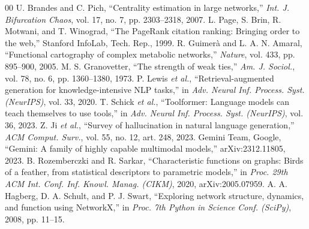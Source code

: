 \documentclass[conference]{IEEEtran}
\begin{document}
\begin{thebibliography}{00}
 U. Brandes and C. Pich, ``Centrality estimation in large networks,'' \emph{Int. J. Bifurcation Chaos}, vol. 17, no. 7, pp. 2303--2318, 2007.
 L. Page, S. Brin, R. Motwani, and T. Winograd, ``The PageRank citation ranking: Bringing order to the web,'' Stanford InfoLab, Tech. Rep., 1999.
 R. Guimer\`a and L. A. N. Amaral, ``Functional cartography of complex metabolic networks,'' \emph{Nature}, vol. 433, pp. 895--900, 2005.
 M. S. Granovetter, ``The strength of weak ties,'' \emph{Am. J. Sociol.}, vol. 78, no. 6, pp. 1360--1380, 1973.
 P. Lewis \emph{et al.}, ``Retrieval-augmented generation for knowledge-intensive NLP tasks,'' in \emph{Adv. Neural Inf. Process. Syst. (NeurIPS)}, vol. 33, 2020.
 T. Schick \emph{et al.}, ``Toolformer: Language models can teach themselves to use tools,'' in \emph{Adv. Neural Inf. Process. Syst. (NeurIPS)}, vol. 36, 2023.
 Z. Ji \emph{et al.}, ``Survey of hallucination in natural language generation,'' \emph{ACM Comput. Surv.}, vol. 55, no. 12, art. 248, 2023.
 Gemini Team, Google, ``Gemini: A family of highly capable multimodal models,'' arXiv:2312.11805, 2023.
 B. Rozemberczki and R. Sarkar, ``Characteristic functions on graphs: Birds of a feather, from statistical descriptors to parametric models,'' in \emph{Proc. 29th ACM Int. Conf. Inf. Knowl. Manag. (CIKM)}, 2020, arXiv:2005.07959.
 A. A. Hagberg, D. A. Schult, and P. J. Swart, ``Exploring network structure, dynamics, and function using NetworkX,'' in \emph{Proc. 7th Python in Science Conf. (SciPy)}, 2008, pp. 11--15.
\end{thebibliography}
\end{document}

